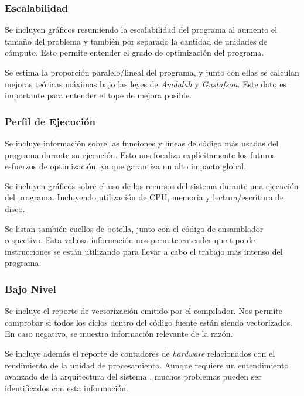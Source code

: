\documentclass[a4paper]{report}
\begin{document}
\subsubsection{Escalabilidad}

Se incluyen gráficos resumiendo la escalabilidad del programa al aumento el tamaño del problema y también por separado la cantidad de unidades de cómputo. 
Esto permite entender el grado de optimización del programa.

\bigskip

Se estima la proporción paralelo/lineal del programa, y junto con ellas se calculan mejoras teóricas máximas bajo las leyes de {\it Amdalah} y {\it Gustafson}.
Este dato es importante para entender el tope de mejora posible.

\subsubsection{Perfil de Ejecución}

Se incluye información sobre las funciones y líneas de código más usadas del programa durante su ejecución. 
Esto nos focaliza explícitamente los futuros esfuerzos de optimización, ya que garantiza un alto impacto global.

\bigskip

Se incluyen gráficos sobre el uso de los recursos del sistema durante una ejecución del programa. Incluyendo utilización de CPU, memoria y lectura/escritura de disco.

\bigskip

Se listan también cuellos de botella, junto con el código de ensamblador respectivo. Esta valiosa información nos permite entender que tipo de instrucciones se están utilizando para llevar a cabo el trabajo más intenso del programa.

\subsubsection{Bajo Nivel}

Se incluye el reporte de vectorización emitido por el compilador. Nos permite comprobar si todos los ciclos dentro del código fuente están siendo vectorizados. 
En caso negativo, se muestra información relevante de la razón.

\bigskip

Se incluye además el reporte de contadores de {\it hardware} relacionados con el rendimiento de la unidad de procesamiento. 
Aunque requiere un entendimiento avanzado de la arquitectura del sistema \cite{hennessy}, muchos problemas pueden ser identificados con esta información.
\end{document}
